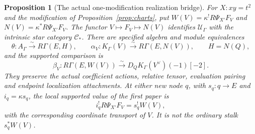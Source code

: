 \documentclass[11pt]{article}
\newtheorem{proposition}[theorem]{Proposition}
\theoremstyle{definition}
\theoremstyle{remark}
\begin{document}
\begin{proposition}[The actual one-modification realization bridge]
\label{prop:one-modification-realization-bridge}
For $X:xy=t^2$ and the modification of Proposition~\ref{prop:charts},
put $W(V)=\kappa^!R\Psi_{X'}F_V$ and $N(V)=\kappa^*R\Psi_{X'}F_V$.
The functor $V\mapsto F_V\mapsto N(V)$ identifies $\mathcal U_\Gamma$
with the intrinsic star category $\mathcal C_*$.  There are specified
algebra and module equivalences
\[
 \theta:A_\Gamma\xrightarrow{\sim}R\Gamma(E,H),\qquad
 \alpha_V:K_\Gamma(V)\xrightarrow{\sim}R\Gamma(E,N(V)),
 \qquad H=N(Q),
\]
and the supported comparison is
\[
 \beta_V:R\Gamma(E,W(V))\xrightarrow{\sim}
          D_QK_\Gamma(V^\vee)(-1)[-2].
\]
They preserve the actual coefficient actions, relative tensor,
evaluation pairing and endpoint localization attachments.  At either
new node $q$, with $s_q:q\to E$ and $i_q=\kappa s_q$, the local
supported value of the first paper is
\[
 i_q^!R\Psi_{X'}F_V=s_q^!W(V),
\]
with the corresponding coordinate transport of $V$.  It is not the
ordinary stalk $s_q^*W(V)$.
\end{proposition}
\end{document}
